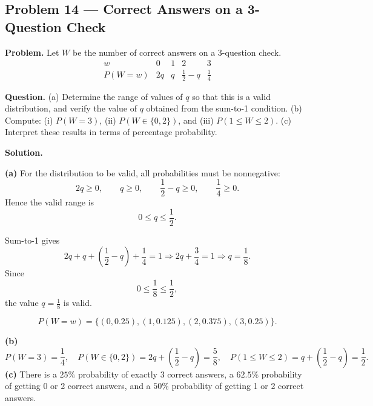 \begin{ExamProblems}
		
		\item
		\subsection*{Problem 14 — Correct Answers on a 3-Question Check}
		
		\textbf{Problem.}
		Let $W$ be the number of correct answers on a 3-question check.
		\[
		\begin{array}{c|cccc}
			w & 0 & 1 & 2 & 3\\
			\hline
			P(W=w) & 2q & q & \frac{1}{2}-q & \frac{1}{4}
		\end{array}
		\]
		
		\textbf{Question.}
		(a) Determine the range of values of $q$ so that this is a valid distribution, and verify the value of $q$ obtained from the sum-to-1 condition.
		(b) Compute: (i) $P(W=3)$, (ii) $P(W\in\{0,2\})$, and (iii) $P(1\le W\le 2)$.
		(c) Interpret these results in terms of percentage probability.
		
		\textbf{Solution.}

		\textbf{(a)} For the distribution to be valid, all probabilities must be nonnegative:
		\[
		2q\ge 0,\qquad q\ge 0,\qquad \frac{1}{2}-q\ge 0,\qquad \frac{1}{4}\ge 0.
		\]
		Hence the valid range is
		\[
		0\le q\le \frac{1}{2}.
		\]
		
		Sum-to-1 gives
		\[
		2q+q+\left(\frac{1}{2}-q\right)+\frac{1}{4}=1
		\Rightarrow 2q+\frac{3}{4}=1
		\Rightarrow q=\frac{1}{8}.
		\]
		Since
		\[
		0\le \frac{1}{8}\le \frac{1}{2},
		\]
		the value $q=\frac{1}{8}$ is valid.
		

		
\[
		P(W=w)=\{(0,0.25),(1,0.125),(2,0.375),(3,0.25)\}.
		\]
\begin{center}
		\end{center}
\textbf{(b)}
		\[
		P(W=3)=\frac{1}{4},\quad
		P(W\in\{0,2\})=2q+\left(\frac{1}{2}-q\right)=\frac{5}{8},\quad
		P(1\le W\le 2)=q+\left(\frac{1}{2}-q\right)=\frac{1}{2}.
		\]
		\textbf{(c)} There is a $25\%$ probability of exactly 3 correct answers, a $62.5\%$ probability of getting 0 or 2 correct answers, and a $50\%$ probability of getting 1 or 2 correct answers.
		

\end{ExamProblems}
